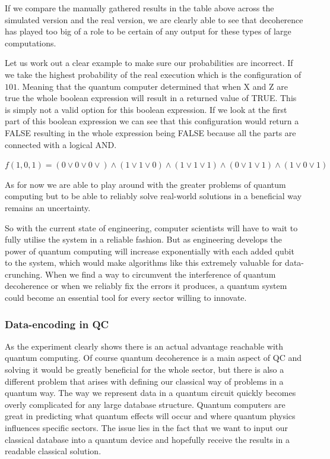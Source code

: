 If we compare the manually gathered results in the table above across the simulated version and the real version, we are clearly able to see that decoherence has played too big of a role to be certain of any output for these types of large computations.

Let us work out a clear example to make sure our probabilities are incorrect. If we take the highest probability of the real execution which is the configuration of $101$. Meaning that the quantum computer determined that when X and Z are true the whole boolean expression will result in a returned value of TRUE. This is simply not a valid option for this boolean expression. If we look at the first part of this boolean expression we can see that this configuration would return a FALSE resulting in the whole expression being FALSE because all the parts are connected with a logical AND. 

$f(1,0,1) = (0 \vee 0 \vee 0 \vee) \wedge (1 \vee 1 \vee 0)  \wedge ( 1 \vee 1 \vee  1) \wedge ( 0 \vee 1 \vee 1) \wedge  ( 1 \vee 0 \vee  1)$

 

As for now we are able to play around with the greater problems of quantum computing but to be able to reliably solve real-world solutions in a beneficial way remains an uncertainty.

So with the current state of engineering, computer scientists will have to wait to fully utilise the system in a reliable fashion. But as engineering develops the power of quantum computing will increase exponentially with each added qubit to the system, which would make algorithms like this extremely valuable for data-crunching. When we find a way to circumvent the interference of quantum decoherence or when we reliably fix the errors it produces, a quantum system could become an essential tool for every sector willing to innovate. 



\subsubsection{Data-encoding in QC}

As the experiment clearly shows there is an actual advantage reachable with quantum computing. Of course quantum decoherence is a main aspect of QC and solving it would be greatly beneficial for the whole sector, but there is also a different problem that arises with defining our classical way of problems in a quantum way. The way we represent data in a quantum circuit quickly becomes overly complicated for any large database structure. Quantum computers are great in predicting what quantum effects will occur and where quantum physics influences specific sectors. The issue lies in the fact that we want to input our classical database into a quantum device and hopefully receive the results in a readable classical solution. 


